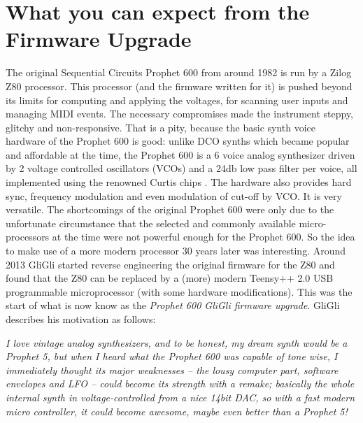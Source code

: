 \documentclass[landscape, 11pt, oneside]{report}
\newenvironment{flowtext}{\addmargin[0cm]{7cm}}{\endaddmargin} %
\begin{document}
\begin{flowtext}

\section{What you can expect from the Firmware Upgrade}

The original Sequential Circuits Prophet 600 from around 1982 is run by a Zilog Z80 processor. This processor (and the firmware written for it) is pushed beyond its limits for computing and applying the voltages, for scanning user inputs and managing MIDI events. The necessary compromises made the instrument steppy, glitchy and non-responsive. That is a pity, because the basic synth voice hardware of the Prophet 600 is good: unlike DCO synths which became popular and affordable at the time, the Prophet 600 is a 6 voice analog synthesizer driven by 2 voltage controlled oscillators (VCOs) and a 24db low pass filter per voice, all implemented using the renowned Curtis chips \cite{curtis}. The hardware also provides hard sync, frequency modulation and even modulation of cut-off by VCO. It is very versatile. The shortcomings of the original Prophet 600 were only due to the unfortunate circumstance that the selected and commonly available micro-processors at the time were not powerful enough for the Prophet 600. So the idea to make use of a more modern processor 30 years later was interesting. Around 2013 GliGli \cite{gligli} started reverse engineering the original firmware for the Z80 and found that the Z80 can be replaced by a (more) modern Teensy++ 2.0 USB programmable microprocessor \cite{teensy} (with some hardware modifications). This was the start of what is now know as the \textit{Prophet 600 GliGli firmware upgrade}. GliGli describes his motivation as follows:

\begin{addmargin}[2cm]{1cm}

\textit{I love vintage analog synthesizers, and to be honest, my dream synth would be a Prophet 5, but when I heard what the Prophet 600 was capable of tone wise, I immediately thought its major weaknesses -- the lousy computer part, software envelopes and LFO -- could become its strength with a remake; basically the whole internal synth in voltage-controlled from a nice 14bit DAC, so with a fast modern micro controller, it could become awesome, maybe even better than a Prophet 5!}

\end{addmargin}


\end{flowtext}
\end{document}
